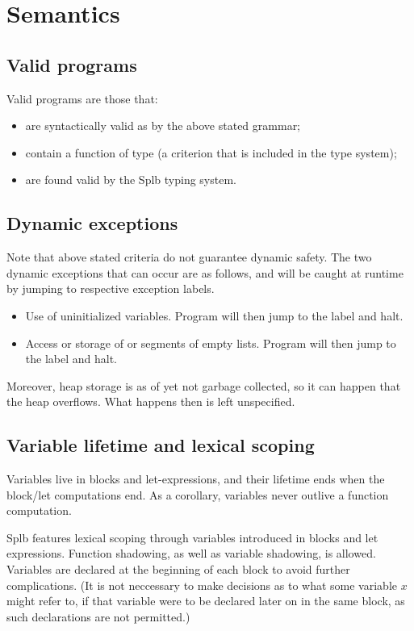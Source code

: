 \documentclass[english,10pt]{article} %
\theoremstyle{definitionstyle}
\theoremstyle{lemmastyle}
\begin{document}
\section{Semantics}

\subsection{Valid programs}

Valid programs are those that:
\begin{itemize}
\item are syntactically valid as by the above stated grammar;
\item contain a function  of type  (a criterion that is included in the type system);
\item are found valid by the Splb typing system.
\end{itemize}

\subsection{Dynamic exceptions}

Note that above stated criteria do not guarantee dynamic safety. The two dynamic exceptions that can occur are as follows, and will be caught at runtime by jumping to respective exception labels.
\begin{itemize}
\item Use of uninitialized variables. Program will then jump to the  label and halt.
\item Access or storage of  or  segments of empty lists. Program will then jump to the  label and halt.
\end{itemize}

Moreover, heap storage is as of yet not garbage collected, so it can happen that the heap overflows. What happens then is left unspecified.

\subsection{Variable lifetime and lexical scoping}

Variables live in blocks and let-expressions, and their lifetime ends when the block/let computations end. As a corollary, variables never outlive a function computation.

Splb features lexical scoping through variables introduced in blocks and let expressions. Function shadowing, as well as variable shadowing, is allowed. Variables are declared at the beginning of each block to avoid further complications. (It is not neccessary to make decisions as to what some variable $x$ might refer to, if that variable were to be declared later on in the same block, as such declarations are not permitted.)
\end{document}
